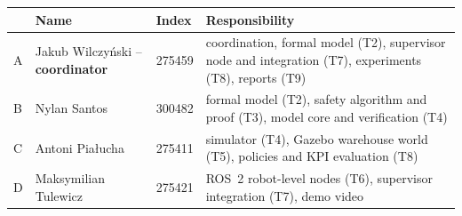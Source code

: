 \documentclass[11pt,a4paper]{article}
\newcommand{\PA}{Jakub Wilczyński}   %
\newcommand{\PB}{Nylan Santos}
\newcommand{\PC}{Antoni Piałucha}
\newcommand{\PD}{Maksymilian Tulewicz}
\newcommand{\IA}{275459}
\newcommand{\IB}{300482}
\newcommand{\IC}{275411}
\newcommand{\ID}{275421}
\begin{document}
\begin{table}[H]
\centering\small
\begin{tabularx}{\textwidth}{@{}l l l X@{}}
\toprule
 & Name & Index & Responsibility \\
\midrule
A & \PA{} -- \textbf{coordinator} & \IA & coordination, formal model (T2), supervisor node and integration (T7), experiments (T8), reports (T9) \\
B & \PB & \IB & formal model (T2), safety algorithm and proof (T3), model core and verification (T4) \\
C & \PC & \IC & simulator (T4), Gazebo warehouse world (T5), policies and KPI evaluation (T8) \\
D & \PD & \ID & ROS~2 robot-level nodes (T6), supervisor integration (T7), demo video \\
\bottomrule
\end{tabularx}
\end{table}
\end{document}
